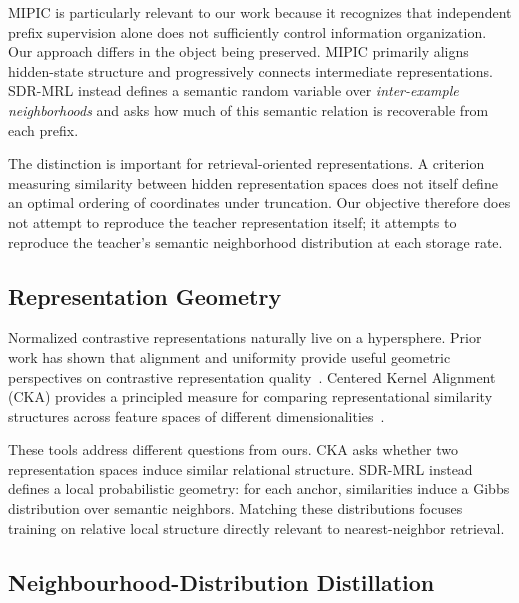 \documentclass[11pt]{article}
\begin{document}
MIPIC is particularly relevant to our work because it recognizes that independent prefix supervision alone does not sufficiently control information organization.
Our approach differs in the object being preserved.
MIPIC primarily aligns hidden-state structure and progressively connects intermediate representations.
SDR-MRL instead defines a semantic random variable over \emph{inter-example neighborhoods} and asks how much of this semantic relation is recoverable from each prefix.

The distinction is important for retrieval-oriented representations.
A criterion measuring similarity between hidden representation spaces does not itself define an optimal ordering of coordinates under truncation.
Our objective therefore does not attempt to reproduce the teacher representation itself; it attempts to reproduce the teacher's semantic neighborhood distribution at each storage rate.

\subsection{Representation Geometry}

Normalized contrastive representations naturally live on a hypersphere.
Prior work has shown that alignment and uniformity provide useful geometric perspectives on contrastive representation quality~\cite{wang2020alignment}.
Centered Kernel Alignment (CKA) provides a principled measure for comparing representational similarity structures across feature spaces of different dimensionalities~\cite{kornblith2019similarity}.

These tools address different questions from ours.
CKA asks whether two representation spaces induce similar relational structure.
SDR-MRL instead defines a local probabilistic geometry:
for each anchor, similarities induce a Gibbs distribution over semantic neighbors.
Matching these distributions focuses training on relative local structure directly relevant to nearest-neighbor retrieval.

\subsection{Neighbourhood-Distribution Distillation}
\end{document}
